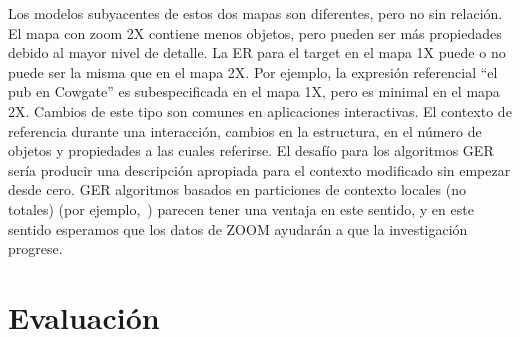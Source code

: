 
 Los modelos subyacentes de estos dos mapas son diferentes, pero no sin relaci\'on. El mapa con zoom 2X contiene menos objetos, pero pueden ser m\'as propiedades debido al mayor nivel de detalle. La ER para el target en el mapa 1X puede o no puede ser la misma que en el mapa 2X. Por ejemplo, la expresi\'on referencial ``el pub en Cowgate'' es subespecificada en el mapa 1X, pero es minimal en el mapa 2X. Cambios de este tipo son comunes en aplicaciones interactivas. El contexto de referencia durante una interacci\'on, cambios en la estructura, en el n\'umero de objetos y propiedades a las cuales referirse. El desaf\'{i}o para los algoritmos GER ser\'{i}a producir una descripci\'on apropiada para el contexto modificado sin empezar desde cero. GER algoritmos basados en particiones de  contexto locales (no totales) (por ejemplo,~\cite{areces08}) parecen tener una ventaja en este sentido, y en este sentido esperamos que los datos de ZOOM ayudar\'an a que la investigaci\'on progrese.


\section{Evaluaci\'on}
\label{corpus-evaluacion}

